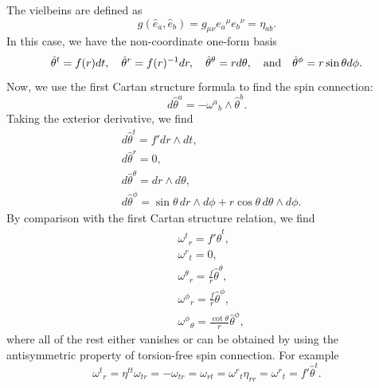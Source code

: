\begin{solution}
    The vielbeins are defined as 
    \begin{equation}
        g(\hat{e}_a,\hat{e}_b) =g_{\mu\nu}e_a{}^\mu e_b{}^\nu = \eta_{ab}.
    \end{equation}
    In this case, we have the non-coordinate one-form basis
    \begin{equation}
        \hat{\theta}^t = f(r)dt, \quad \hat{\theta}^r = f(r)^{-1}dr,\quad \hat{\theta}^\theta = rd\theta, \quad {\rm and}\quad \hat{\theta}^\phi =r\sin\theta d\phi.
    \end{equation}
    Now, we use the first Cartan structure formula to find the spin connection:
    \begin{equation}
        d\hat{\theta}^a = - \omega^a{}_b \wedge\hat{\theta}^b.
    \end{equation}
    Taking the exterior derivative, we find
    \begin{align}
        &d\hat{\theta}^t = f'dr\wedge dt,\\
        &d\hat{\theta}^r =0,\\
        &d\hat{\theta}^\theta =dr\wedge d\theta,\\
        &d\hat{\theta}^\phi = \sin\theta \,dr\wedge d\phi +r\cos\theta \,d\theta\wedge d\phi.
    \end{align}
    By comparison with the first Cartan structure relation, we find
    \begin{align}
        &\omega^t{}_r = f'\hat{\theta}^t,\\
        &\omega^r{}_t = 0,\\
        &\omega^\theta{}_r = \frac{f}{r}\hat{\theta}^\theta,\\
        &\omega^\phi{}_r = \frac{f}{r}\hat{\theta}^\phi,\\
        &\omega^\phi{}_\theta = \frac{\cot\theta}{r}\hat{\theta}^\phi,
    \end{align}
    where all of the rest either vanishes or can be obtained by using the antisymmetric property of torsion-free spin connection. For example
    \begin{equation}
        \omega^t{}_r = \eta^{tt}\omega_{tr} = -\omega_{tr} = \omega_{rt} = \omega^r{}_t\eta_{rr} = \omega^r{}_t = f'\hat{\theta}^t.
    \end{equation}


\end{solution}
